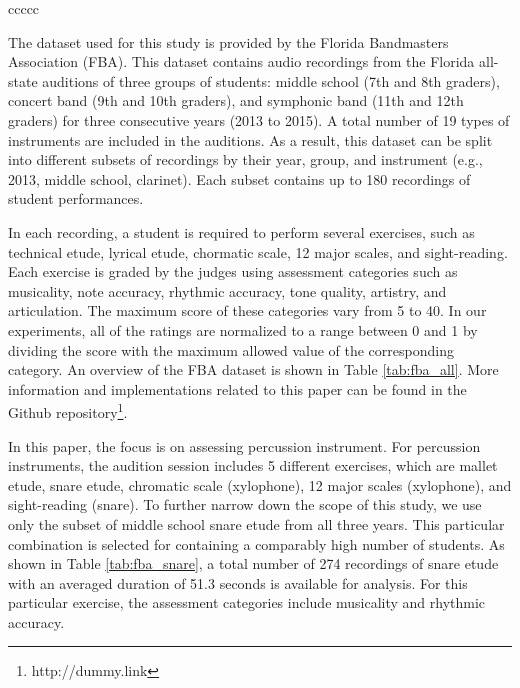 \documentclass{article}
\begin{document}
\begin{table}[]
\begin{tabular}{ccccc}
 \\ \hline
\end{tabular}
\caption{An overview of numbers of student recordings in FBA dataset from 2013 to 2015}
\label{tab:fba_all}
\end{table}

The dataset used for this study is provided by the Florida Bandmasters Association (FBA). This dataset contains audio recordings from the Florida all-state auditions of three groups of students: middle school (7th and 8th graders), concert band (9th and 10th graders), and symphonic band (11th and 12th graders) for three consecutive years (2013 to 2015). A total number of 19 types of instruments are included in the auditions. As a result, this dataset can be split into different subsets of recordings by their year, group, and instrument (e.g., 2013, middle school, clarinet). Each subset contains up to 180 recordings of student performances.  

In each recording, a student is required to perform several exercises, such as technical etude, lyrical etude, chormatic scale, 12 major scales, and sight-reading. Each exercise is graded by the judges using assessment categories such as musicality, note accuracy, rhythmic accuracy, tone quality, artistry, and articulation. The maximum score of these categories vary from 5 to 40. In our experiments, all of the ratings are normalized to a range between 0 and 1 by dividing the score with the maximum allowed value of the corresponding category. An overview of the FBA dataset is shown in Table \ref{tab:fba_all}. More information and implementations related to this paper can be found in the Github repository\footnote{http://dummy.link}.  

In this paper, the focus is on assessing percussion instrument. For percussion instruments, the audition session includes 5 different exercises, which are mallet etude, snare etude, chromatic scale (xylophone), 12 major scales (xylophone), and sight-reading (snare). To further narrow down the scope of this study, we use only the subset of middle school snare etude from all three years. This particular combination is selected for containing a comparably high number of students. As shown in Table \ref{tab:fba_snare}, a total number of 274 recordings of snare etude with an averaged duration of 51.3 seconds is available for analysis. For this particular exercise, the assessment categories include musicality and rhythmic accuracy.
\end{document}
